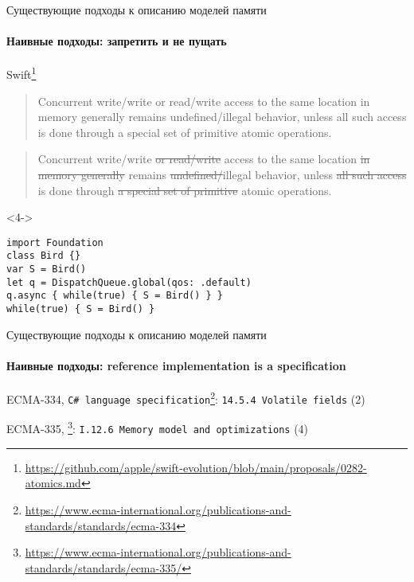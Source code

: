 \begin{frame}[fragile, t]{Существующие подходы к описанию моделей памяти}
\framesubtitle{Наивные подходы: запретить и не пущать}
Swift\footnote{\tiny\url{https://github.com/apple/swift-evolution/blob/main/proposals/0282-atomics.md}}

 {
\begin{quote}
Concurrent write/write or read/write access to the same location in memory generally remains undefined/illegal behavior, unless all such access is done through a special set of primitive atomic operations.
\end{quote}
}

 {
\begin{quote}
Concurrent write/write \sout{or read/write} access to the same location \sout{in memory generally} remains \sout{undefined/}illegal behavior, unless \sout{all such access} is done through \sout{a special set of primitive} atomic operations.
\end{quote}	
}


\begin{onlyenv}<4->
\begin{verbatim}
import Foundation
class Bird {}
var S = Bird()
let q = DispatchQueue.global(qos: .default)
q.async { while(true) { S = Bird() } }
while(true) { S = Bird() }
\end{verbatim}
\end{onlyenv}



\end{frame}


\begin{frame}[t]{Существующие подходы к описанию моделей памяти}
\framesubtitle{Наивные подходы: reference implementation is a specification}

{\small
ECMA-334, \texttt{C\# language specification}\footnote{\tiny\url{https://www.ecma-international.org/publications-and-standards/standards/ecma-334}}: \texttt{14.5.4 Volatile fields} (2)
}

{\small
ECMA-335, \footnote{\tiny\url{https://www.ecma-international.org/publications-and-standards/standards/ecma-335/}}: \texttt{I.12.6 Memory model and optimizations} (4)
}
\end{frame}


